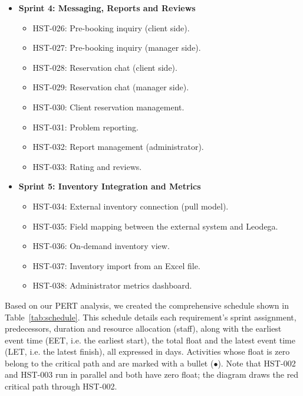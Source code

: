 \documentclass[11pt,a4paper,oneside]{report}
\begin{document}
\begin{itemize}
\begin{itemize}
        \item HST-019: Personal/organization context switcher.
        \item HST-020: Organization selector (mobile).
        \item HST-021: Inviting client users to the organization.
        \item HST-022: Accepting or rejecting invitations.
        \item HST-023: Organization administration panel.
        \item HST-024: Reserving on behalf of an organization.
        \item HST-025: Protection of organization reservations.
    \end{itemize}
    \item \textbf{Sprint 4: Messaging, Reports and Reviews}
    \begin{itemize}
        \item HST-026: Pre-booking inquiry (client side).
        \item HST-027: Pre-booking inquiry (manager side).
        \item HST-028: Reservation chat (client side).
        \item HST-029: Reservation chat (manager side).
        \item HST-030: Client reservation management.
        \item HST-031: Problem reporting.
        \item HST-032: Report management (administrator).
        \item HST-033: Rating and reviews.
    \end{itemize}
    \item \textbf{Sprint 5: Inventory Integration and Metrics}
    \begin{itemize}
        \item HST-034: External inventory connection (pull model).
        \item HST-035: Field mapping between the external system and Leodega.
        \item HST-036: On-demand inventory view.
        \item HST-037: Inventory import from an Excel file.
        \item HST-038: Administrator metrics dashboard.
    \end{itemize}
\end{itemize}

Based on our PERT analysis, we created the comprehensive schedule shown in
Table~\ref{tab:schedule}. This schedule details each requirement's sprint
assignment, predecessors, duration and resource allocation (staff), along with the
earliest event time (EET, i.e. the earliest start), the total float and the latest
event time (LET, i.e. the latest finish), all expressed in days. Activities whose
float is zero belong to the critical path and are marked with a bullet
($\bullet$). Note that HST-002 and HST-003 run in parallel and both have zero
float; the diagram draws the red critical path through HST-002.
\end{document}
